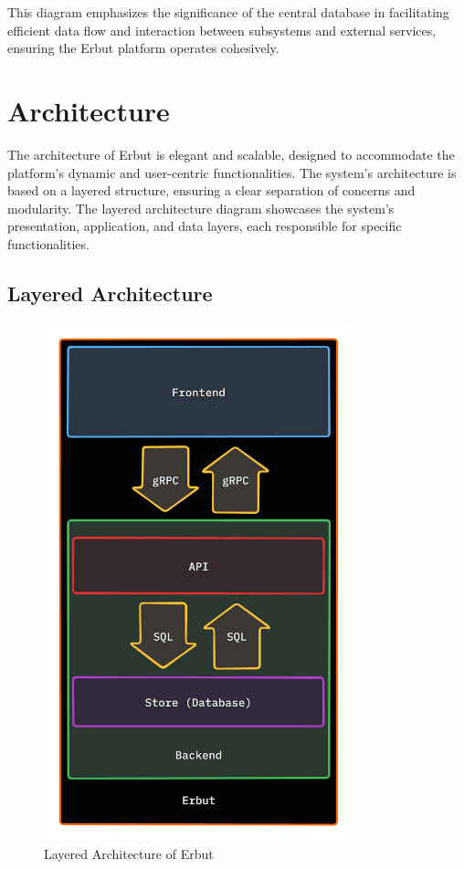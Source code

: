 \documentclass[a4paper]{report}
\begin{document}
This diagram emphasizes the significance of the central database in facilitating efficient data flow and interaction between subsystems and external services, ensuring the Erbut platform operates cohesively.

\chapter{Architecture}

The architecture of Erbut is elegant and scalable, designed to accommodate the platform's dynamic and user-centric functionalities. The system's architecture is based on a layered structure, ensuring a clear separation of concerns and modularity. The layered architecture diagram showcases the system's presentation, application, and data layers, each responsible for specific functionalities.

\section{Layered Architecture}

\begin{figure}[h!]
    \centering
    \includegraphics[width=0.8\textwidth]{images/erbut-layered-architecture.png}
    \caption{Layered Architecture of Erbut}
    \label{fig:layered-architecture}
\end{figure}
\end{document}
